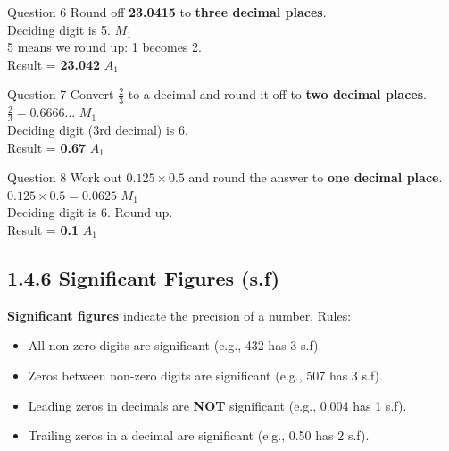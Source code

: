 \documentclass[12pt, a4paper, oneside]{article}
\begin{document}
\begin{solvingbox}{Question 6}
Round off \textbf{23.0415} to \textbf{three decimal places}. \\
Deciding digit is 5. \hfill $M_1$ \\
5 means we round up: 1 becomes 2. \\
Result = \textbf{23.042} \hfill $A_1$
\end{solvingbox}

\begin{solvingbox}{Question 7}
Convert \textbf{$\frac{2}{3}$} to a decimal and round it off to \textbf{two decimal places}. \\
$\frac{2}{3} = 0.6666...$ \hfill $M_1$ \\
Deciding digit (3rd decimal) is 6. \\
Result = \textbf{0.67} \hfill $A_1$
\end{solvingbox}

\begin{solvingbox}{Question 8}
Work out $0.125 \times 0.5$ and round the answer to \textbf{one decimal place}. \\
$0.125 \times 0.5 = 0.0625$ \hfill $M_1$ \\
Deciding digit is 6. Round up. \\
Result = \textbf{0.1} \hfill $A_1$
\end{solvingbox}

\newpage

\subsection*{1.4.6 Significant Figures (s.f)}

\begin{tcolorbox}[colback=lightgrey, colframe=primaryblue, title=\textbf{Concept Summary}, arc=5pt]
    \textbf{Significant figures} indicate the precision of a number. Rules:
    \begin{itemize}
        \item All non-zero digits are significant (e.g., 432 has 3 s.f).
        \item Zeros between non-zero digits are significant (e.g., 507 has 3 s.f).
        \item Leading zeros in decimals are \textbf{NOT} significant (e.g., 0.004 has 1 s.f).
        \item Trailing zeros in a decimal are significant (e.g., 0.50 has 2 s.f).
    \end{itemize}
\end{tcolorbox}
\end{document}
